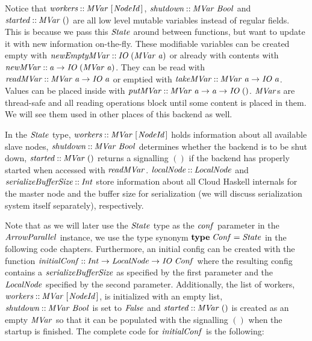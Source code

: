\documentclass[paper=A4,twoside=true,openright,parskip=full,chapterprefix=true,headings=normal,bibliography=totoc,listof=totoc,titlepage=on,captions=tableabove,draft=false,british]{scrreprt}%
\begin{document}
Notice that \ensuremath{\Varid{workers}\mathbin{::}\Conid{MVar}\;[\mskip1.5mu \Conid{NodeId}\mskip1.5mu]}, \ensuremath{\Varid{shutdown}\mathbin{::}\Conid{MVar}\;\Conid{Bool}} and
\ensuremath{\Varid{started}\mathbin{::}\Conid{MVar}\;()} are all low level mutable variables instead of
regular fields. This is because we pass this \ensuremath{\Conid{State}} around between
functions, but want to update it with new information on-the-fly. These
modifiable variables can be created empty with
\ensuremath{\Varid{newEmptyMVar}\mathbin{::}\Conid{IO}\;(\Conid{MVar}\;\Varid{a})} or already with contents with
\ensuremath{\Varid{newMVar}\mathbin{::}\Varid{a}\to \Conid{IO}\;(\Conid{MVar}\;\Varid{a})}. They can be read with
\ensuremath{\Varid{readMVar}\mathbin{::}\Conid{MVar}\;\Varid{a}\to \Conid{IO}\;\Varid{a}} or emptied with
\ensuremath{\Varid{takeMVar}\mathbin{::}\Conid{MVar}\;\Varid{a}\to \Conid{IO}\;\Varid{a}}. Values can be placed inside with
\ensuremath{\Varid{putMVar}\mathbin{::}\Conid{MVar}\;\Varid{a}\to \Varid{a}\to \Conid{IO}\;()}. \ensuremath{\Conid{MVar}}s are thread-safe and all
reading operations block until some content is placed in them. We will
see them used in other places of this backend as well.

In the \ensuremath{\Conid{State}} type, \ensuremath{\Varid{workers}\mathbin{::}\Conid{MVar}\;[\mskip1.5mu \Conid{NodeId}\mskip1.5mu]} holds information about
all available slave nodes, \ensuremath{\Varid{shutdown}\mathbin{::}\Conid{MVar}\;\Conid{Bool}} determines whether
the backend is to be shut down, \ensuremath{\Varid{started}\mathbin{::}\Conid{MVar}\;()} returns a
signalling \ensuremath{()} if the backend has properly started when accessed with
\ensuremath{\Varid{readMVar}}. \ensuremath{\Varid{localNode}\mathbin{::}\Conid{LocalNode}} and \ensuremath{\Varid{serializeBufferSize}\mathbin{::}\Conid{Int}}
store information about all Cloud Haskell internals for the master node
and the buffer size for serialization (we will discuss serialization
system itself separately), respectively.

Note that as we will later use the \ensuremath{\Conid{State}} type as the \ensuremath{\Varid{conf}} parameter
in the \linebreak \ensuremath{\Conid{ArrowParallel}} instance, we use the type synonym
\ensuremath{\mathbf{type}\;\Conid{Conf}\mathrel{=}\Conid{State}} in the following code chapters. Furthermore, an
initial config can be created with the function
\ensuremath{\Varid{initialConf}\mathbin{::}\Conid{Int}\to \Conid{LocalNode}\to \Conid{IO}\;\Conid{Conf}} where the resulting config
contains a \ensuremath{\Varid{serializeBufferSize}} as specified by the first parameter and
the \ensuremath{\Conid{LocalNode}} specified by the second parameter. Additionally, the
list of workers, \ensuremath{\Varid{workers}\mathbin{::}\Conid{MVar}\;[\mskip1.5mu \Conid{NodeId}\mskip1.5mu]}, is initialized with an
empty list, \ensuremath{\Varid{shutdown}\mathbin{::}\Conid{MVar}\;\Conid{Bool}} is set to \ensuremath{\Conid{False}} and
\ensuremath{\Varid{started}\mathbin{::}\Conid{MVar}\;()} is created as an empty \ensuremath{\Conid{MVar}} so that it can be
populated with the signalling \ensuremath{()} when the startup is finished. The
complete code for \ensuremath{\Varid{initialConf}} is the following:
\end{document}

